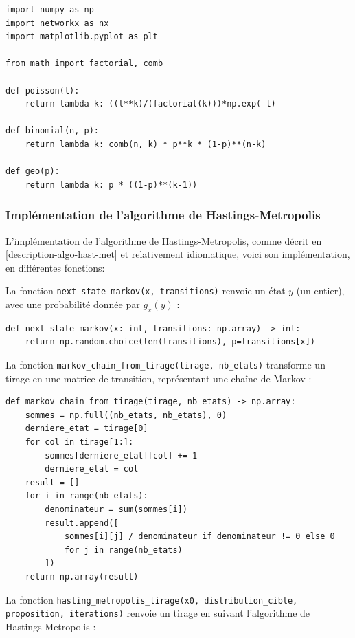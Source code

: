 \documentclass{article}
\begin{document}
\begin{verbatim}
import numpy as np
import networkx as nx
import matplotlib.pyplot as plt

from math import factorial, comb

def poisson(l):
    return lambda k: ((l**k)/(factorial(k)))*np.exp(-l)

def binomial(n, p):
    return lambda k: comb(n, k) * p**k * (1-p)**(n-k)

def geo(p):
    return lambda k: p * ((1-p)**(k-1))
\end{verbatim}

\newpage
\subsubsection{Implémentation de l'algorithme de Hastings-Metropolis}

L’implémentation de l’algorithme de Hastings-Metropolis, comme décrit en \ref{description-algo-hast-met} et relativement idiomatique, voici son implémentation, en différentes fonctions: 

La fonction \texttt{next\_state\_markov(x, transitions)} renvoie un état \( y \) (un entier), avec une probabilité donnée par \( g_x(y) \) :

\begin{verbatim}
def next_state_markov(x: int, transitions: np.array) -> int:
    return np.random.choice(len(transitions), p=transitions[x])
\end{verbatim}

La fonction \texttt{markov\_chain\_from\_tirage(tirage, nb\_etats)} transforme un tirage en une matrice de transition, représentant une chaîne de Markov :

\begin{verbatim}
def markov_chain_from_tirage(tirage, nb_etats) -> np.array:
    sommes = np.full((nb_etats, nb_etats), 0)
    derniere_etat = tirage[0]
    for col in tirage[1:]:
        sommes[derniere_etat][col] += 1
        derniere_etat = col
    result = []
    for i in range(nb_etats):
        denominateur = sum(sommes[i])
        result.append([
            sommes[i][j] / denominateur if denominateur != 0 else 0 
            for j in range(nb_etats)
        ])
    return np.array(result)
\end{verbatim}

La fonction \texttt{hasting\_metropolis\_tirage(x0, distribution\_cible, proposition, iterations)} renvoie un tirage en suivant l’algorithme de Hastings-Metropolis :
\end{document}

